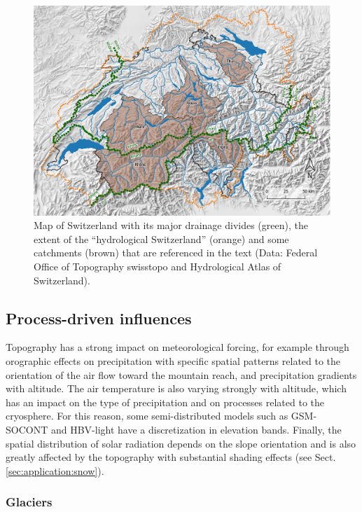\documentclass[10pt,a4paper]{article}
\begin{document}
\begin{figure}[htb]
	\begin{center}
		\includegraphics[width=0.95\columnwidth]{figures/map}
		\caption{{Map of Switzerland with its major drainage divides (green), the extent of the ``hydrological Switzerland'' (orange) and some catchments (brown) that are referenced in the text (Data: Federal Office of Topography swisstopo and Hydrological Atlas of Switzerland). \label{fig:map}
		}}
	\end{center}
\end{figure}


\subsection{Process-driven influences}
\label{sec:application:processes}

Topography has a strong impact on meteorological forcing, for example through orographic effects on precipitation with specific spatial patterns related to the orientation of the air flow toward the mountain reach, and precipitation gradients with altitude. The air temperature is also varying strongly with altitude, which has an impact on the type of precipitation and on processes related to the cryosphere. For this reason, some semi-distributed models such as GSM-SOCONT and HBV-light have a discretization in elevation bands. Finally, the spatial distribution of solar radiation depends on the slope orientation and is also greatly affected by the topography with substantial shading effects (see Sect. \ref{sec:application:snow}).


\subsubsection{Glaciers}
\label{sec:application:glaciers}
\end{document}
